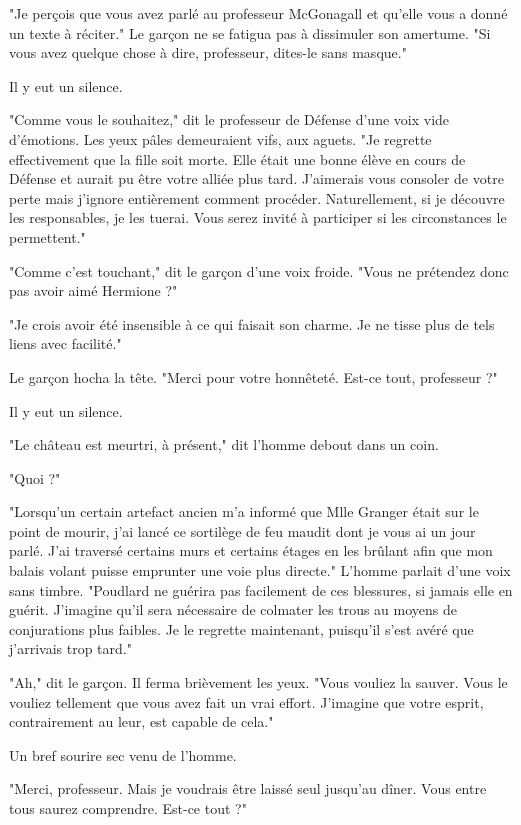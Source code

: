 "Je perçois que vous avez parlé au professeur McGonagall et qu'elle vous a donné un texte à réciter." Le garçon ne se fatigua pas à dissimuler son amertume. "Si vous avez quelque chose à dire, professeur, dites-le sans masque."

Il y eut un silence.

"Comme vous le souhaitez," dit le professeur de Défense d'une voix vide d'émotions. Les yeux pâles demeuraient vifs, aux aguets. "Je regrette effectivement que la fille soit morte. Elle était une bonne élève en cours de Défense et aurait pu être votre alliée plus tard. J'aimerais vous consoler de votre perte mais j'ignore entièrement comment procéder. Naturellement, si je découvre les responsables, je les tuerai. Vous serez invité à participer si les circonstances le permettent."

"Comme c'est touchant," dit le garçon d'une voix froide. "Vous ne prétendez donc pas avoir aimé Hermione ?"

"Je crois avoir été insensible à ce qui faisait son charme. Je ne tisse plus de tels liens avec facilité."

Le garçon hocha la tête. "Merci pour votre honnêteté. Est-ce tout, professeur ?"

Il y eut un silence.

"Le château est meurtri, à présent," dit l'homme debout dans un coin.

"Quoi ?"

"Lorsqu'un certain artefact ancien m'a informé que Mlle Granger était sur le point de mourir, j'ai lancé ce sortilège de feu maudit dont je vous ai un jour parlé. J'ai traversé certains murs et certains étages en les brûlant afin que mon balais volant puisse emprunter une voie plus directe." L'homme parlait d'une voix sans timbre. "Poudlard ne guérira pas facilement de ces blessures, si jamais elle en guérit. J'imagine qu'il sera nécessaire de colmater les trous au moyens de conjurations plus faibles. Je le regrette maintenant, puisqu'il s'est avéré que j'arrivais trop tard."

"Ah," dit le garçon. Il ferma brièvement les yeux. "Vous vouliez la sauver. Vous le vouliez tellement que vous avez fait un vrai effort. J'imagine que votre esprit, contrairement au leur, est capable de cela."

Un bref sourire sec venu de l'homme.

"Merci, professeur. Mais je voudrais être laissé seul jusqu'au dîner. Vous entre tous saurez comprendre. Est-ce tout ?"

